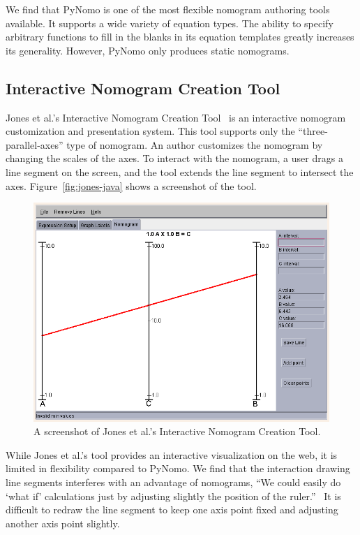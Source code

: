 \documentclass{proc}
\begin{document}
We find that PyNomo is one of the most flexible nomogram authoring
tools available.
It supports a wide variety of equation types.
The ability to specify arbitrary functions to fill in the blanks in
its equation templates greatly increases its generality.
However, PyNomo only produces static nomograms.

\subsection{Interactive Nomogram Creation Tool}
Jones et al.'s Interactive Nomogram Creation Tool~\cite{jones-java} is
an interactive nomogram customization and presentation system.
This tool supports only the ``three-parallel-axes'' type of nomogram.
An author customizes the nomogram by changing the scales of the axes.
To interact with the nomogram, a user drags a line segment on the
screen, and the tool extends the line segment to intersect the axes.
Figure~\ref{fig:jones-java} shows a screenshot of the tool.

\begin{figure}
\label{fig:pynomo-pdf}
\includegraphics[width=\columnwidth]{jones-java.png}
\caption{A screenshot of Jones et al.'s Interactive Nomogram Creation
  Tool.}
\end{figure}

While Jones et al.'s tool provides an interactive visualization on the
web, it is limited in flexibility compared to PyNomo.
We find that the interaction drawing line segments interferes with an
advantage of nomograms, ``We could easily do `what if' calculations
just by adjusting slightly the position of the
ruler.''~\cite{card1999readings}
It is difficult to redraw the line segment to keep one axis point
fixed and adjusting another axis point slightly.
\end{document}
